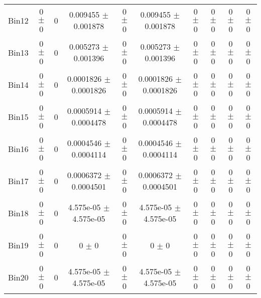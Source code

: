 \begin{tabular}{@{\extracolsep{4pt}}lccccccccc@{}}
     Bin12 & 0 $\pm$ 0 & 0 & 0.009455 $\pm$ 0.001878 & 0 $\pm$ 0 & 0.009455 $\pm$ 0.001878 & 0 $\pm$ 0 & 0 $\pm$ 0 & 0 $\pm$ 0 & 0 $\pm$ 0 \\ 
     Bin13 & 0 $\pm$ 0 & 0 & 0.005273 $\pm$ 0.001396 & 0 $\pm$ 0 & 0.005273 $\pm$ 0.001396 & 0 $\pm$ 0 & 0 $\pm$ 0 & 0 $\pm$ 0 & 0 $\pm$ 0 \\ 
     Bin14 & 0 $\pm$ 0 & 0 & 0.0001826 $\pm$ 0.0001826 & 0 $\pm$ 0 & 0.0001826 $\pm$ 0.0001826 & 0 $\pm$ 0 & 0 $\pm$ 0 & 0 $\pm$ 0 & 0 $\pm$ 0 \\ 
     Bin15 & 0 $\pm$ 0 & 0 & 0.0005914 $\pm$ 0.0004478 & 0 $\pm$ 0 & 0.0005914 $\pm$ 0.0004478 & 0 $\pm$ 0 & 0 $\pm$ 0 & 0 $\pm$ 0 & 0 $\pm$ 0 \\ 
     Bin16 & 0 $\pm$ 0 & 0 & 0.0004546 $\pm$ 0.0004114 & 0 $\pm$ 0 & 0.0004546 $\pm$ 0.0004114 & 0 $\pm$ 0 & 0 $\pm$ 0 & 0 $\pm$ 0 & 0 $\pm$ 0 \\ 
     Bin17 & 0 $\pm$ 0 & 0 & 0.0006372 $\pm$ 0.0004501 & 0 $\pm$ 0 & 0.0006372 $\pm$ 0.0004501 & 0 $\pm$ 0 & 0 $\pm$ 0 & 0 $\pm$ 0 & 0 $\pm$ 0 \\ 
     Bin18 & 0 $\pm$ 0 & 0 & 4.575e-05 $\pm$ 4.575e-05 & 0 $\pm$ 0 & 4.575e-05 $\pm$ 4.575e-05 & 0 $\pm$ 0 & 0 $\pm$ 0 & 0 $\pm$ 0 & 0 $\pm$ 0 \\ 
     Bin19 & 0 $\pm$ 0 & 0 & 0 $\pm$ 0 & 0 $\pm$ 0 & 0 $\pm$ 0 & 0 $\pm$ 0 & 0 $\pm$ 0 & 0 $\pm$ 0 & 0 $\pm$ 0 \\ 
     Bin20 & 0 $\pm$ 0 & 0 & 4.575e-05 $\pm$ 4.575e-05 & 0 $\pm$ 0 & 4.575e-05 $\pm$ 4.575e-05 & 0 $\pm$ 0 & 0 $\pm$ 0 & 0 $\pm$ 0 & 0 $\pm$ 0 \\ 
\hline\hline
  \end{tabular}

